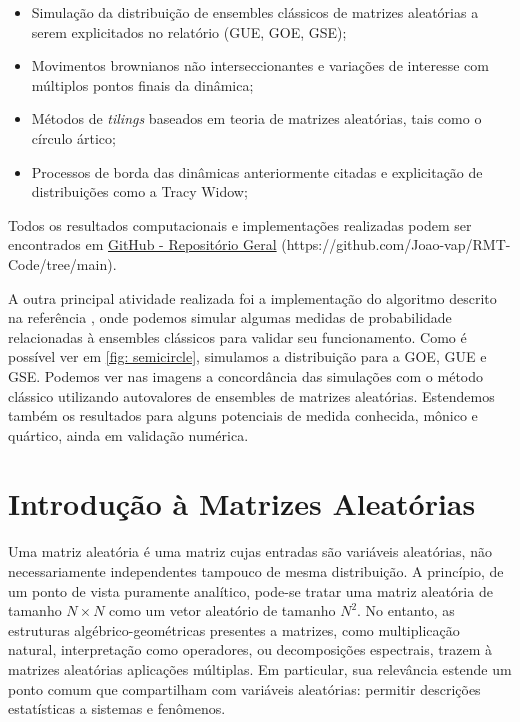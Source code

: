 \documentclass[12pt]{report}
\begin{document}
	\begin{itemize}
		\item Simulação da distribuição de ensembles clássicos de matrizes aleatórias a serem explicitados no relatório (GUE, GOE, GSE);
		\item Movimentos brownianos não interseccionantes e variações de interesse com múltiplos pontos finais da dinâmica;
		\item Métodos de \textit{tilings} baseados em teoria de matrizes aleatórias, tais como o círculo ártico;
		\item Processos de borda das dinâmicas anteriormente citadas e explicitação de distribuições como a Tracy Widow;
	\end{itemize}
	
	Todos os resultados computacionais e implementações realizadas podem ser encontrados em \href{https://github.com/Joao-vap/RMT-Code/tree/main}{GitHub - Repositório Geral} (https://github.com/Joao-vap/RMT-Code/tree/main). 
	
	A outra principal atividade realizada foi a implementação do algoritmo descrito na referência \cite{Chafa__2018}, onde podemos simular algumas medidas de probabilidade relacionadas à ensembles clássicos para validar seu funcionamento. Como é possível ver em \ref{fig: semicircle}, simulamos a distribuição para a GOE, GUE e GSE. Podemos ver nas imagens a concordância das simulações com o método clássico utilizando autovalores de ensembles de matrizes aleatórias. Estendemos também os resultados para alguns potenciais de medida conhecida, mônico e quártico, ainda em validação numérica. 
	
	\section{Introdução à Matrizes Aleatórias}\label{chp:resumoProj} 
	
	Uma matriz aleatória é uma matriz cujas entradas são variáveis aleatórias, não necessariamente independentes tampouco de mesma distribuição. A princípio, de um ponto de vista puramente analítico, pode-se tratar uma matriz aleatória de tamanho $N\times N$ como um vetor aleatório de tamanho $N^2$. No entanto, as estruturas algébrico-geométricas presentes a matrizes, como multiplicação natural, interpretação como operadores, ou decomposições espectrais, trazem à matrizes aleatórias aplicações múltiplas. Em particular, sua relevância estende um ponto comum que compartilham com variáveis aleatórias: permitir descrições estatísticas a sistemas e fenômenos. 
	
\end{document}
